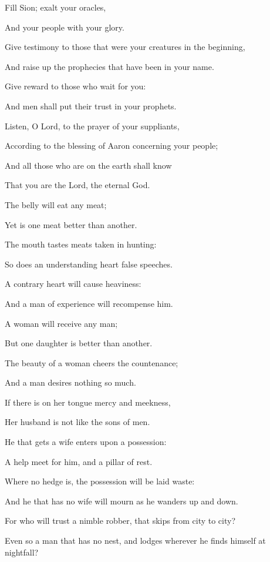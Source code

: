 {\par }{\Q {}Fill Sion; exalt your oracles,
\par }{\Q And
{} your people with your glory.
\par }{\Q {}Give testimony to those that were your creatures in the beginning,
\par }{\Q And raise up the prophecies that have been in your name.
\par }{\Q {}Give reward to those who wait for you:
\par }{\Q And men shall put their trust in your prophets.
\par }{\Q {}Listen, O Lord, to the prayer of your suppliants,
\par }{\Q According to the blessing of Aaron concerning your people;
\par }{\Q And all those who are on the earth shall know
\par }{\Q That you are the Lord, the
 eternal God.
\par }{\BB \par }{\Q {}The belly will eat any meat;
\par }{\Q Yet is one meat better than another.
\par }{\Q {}The
 mouth tastes meats taken in hunting:
\par }{\Q So does an understanding heart false speeches.
\par }{\Q {}A contrary heart will cause heaviness:
\par }{\Q And a man of experience will recompense him.
\par }{\Q {}A woman will receive any man;
\par }{\Q But one daughter is better than another.
\par }{\Q {}The beauty of a woman cheers the countenance;
\par }{\Q And a man desires nothing so much.
\par }{\Q {}If there is on her tongue mercy and meekness,
\par }{\Q Her husband is not like the sons of men.
\par }{\Q {}He that gets a wife enters upon a possession:
\par }{\Q A help meet for him, and a pillar of rest.
\par }{\Q {}Where no hedge is, the possession will be laid waste:
\par }{\Q And he that has no wife will mourn as he wanders up and down.
\par }{\Q {}For who will trust a nimble robber, that skips from city to city?
\par }{\Q Even so
{} a man that has no nest, and lodges wherever he finds himself at nightfall?
\par }{\BB \par }
